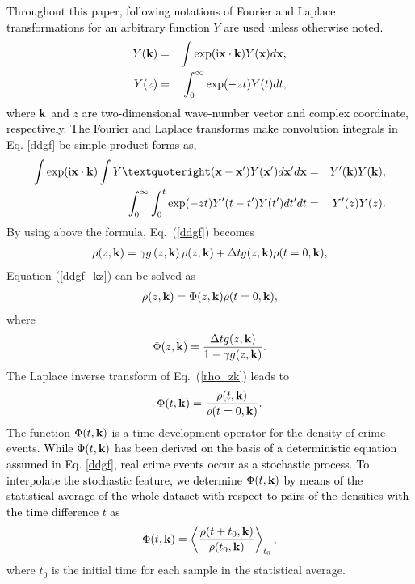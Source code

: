\documentclass[review]{elsarticle}
\newcommand{\red}[1]{\textcolor{black}{#1}}
\newcommand{\bra}{\left\langle}
\newcommand{\ket}{\right\rangle}
\newcommand{\bv}[1]{{\bf #1}}
\newcommand{\lr}[1]{\left(#1\right)}
\newcommand{\nm}{\nonumber}
\begin{document}
\red{
Throughout this paper,
following notations of Fourier and Laplace
transformations for an arbitrary 
function $Y$ are used unless otherwise noted.
\begin{eqnarray}
Y(\bv{k}) &=& \int \exp(\textrm{i} \bv{x} \cdot \bv{k}) Y(\bv{x}) d\bv{x}, \nm \\
Y(z) &=& \int_{0}^{\infty}
 \exp(- z t) Y(t) dt, \nm
\end{eqnarray}
where $\bv{k}$ and $z$ are two-dimensional wave-number vector and 
complex coordinate, respectively.
The Fourier and Laplace transforms 
make
convolution integrals in Eq. \ref{ddgf} be simple product forms as,
\begin{eqnarray}
\int \exp(\textrm{i} \bv{x} \cdot \bv{k}) \int 
Y’(\bv{x} - \bv{x'}) Y(\bv{x'}) d\bv{x'}d\bv{x} &=&
Y'(\bv{k}) Y(\bv{k}), \nm \\
\int_{0}^{\infty} \int_{0}^{t}\exp(- z t) Y'(t-t') Y(t') dt'  dt &=& Y'(z) Y(z). \nm
\end{eqnarray}
}
By using above the formula, 
Eq.~(\ref{ddgf}) becomes
\begin{eqnarray}
  \rho(z,\bv{k}) =   \gamma g\lr{z,\bv{k}}   \rho(z,\bv{k})
  +  \Delta t g(z,\bv{k})  \rho(t=0,\bv{k}),
\label{ddgf_kz}
\end{eqnarray}
Equation (\ref{ddgf_kz}) can be solved as
\begin{eqnarray}
  \rho(z,\bv{k}) = \Phi(z,\bv{k})   \rho(t=0,\bv{k}),
\label{rho_zk}
\end{eqnarray}
where
\begin{equation}
\Phi(z,\bv{k}) = \frac{ \Delta t g(z,\bv{k})}{1 - \gamma   g(z,\bv{k})}.
\label{phi_g}
\end{equation}
The Laplace inverse transform of Eq.~(\ref{rho_zk}) leads to
\begin{eqnarray}
 \Phi(t,\bv{k}) =\frac{  \rho(t,\bv{k}) }{  \rho(t=0,\bv{k})}.
 \nonumber
\end{eqnarray}
The function $\Phi(t,\bv{k})$
is a time development operator for the density of crime events.
\red{
While $\Phi(t,\bv{k})$
has been derived
 on the basis of a deterministic equation assumed in Eq. \ref{ddgf},
real crime events occur as a stochastic process. 
To interpolate the stochastic feature, we determine $\Phi(t,\bv{k})$ by means of the statistical average
of the whole dataset with respect to
pairs of the densities with the time difference $t$ as
}
\begin{eqnarray}
 \Phi(t,\bv{k}) =\bra\frac{  \rho(t+t_0,\bv{k}) }{  \rho(t_0,\bv{k})}\ket_{t_0},
 \label{phi}
\end{eqnarray}
where $t_0$  is the initial time for each sample in the statistical average.
\end{document}
